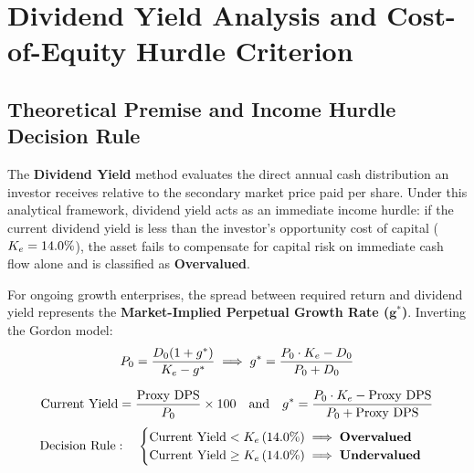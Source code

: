 
\clearpage
\section[Dividend Yield Analysis]{Dividend Yield Analysis and Cost-of-Equity Hurdle Criterion}

\subsection{Theoretical Premise and Income Hurdle Decision Rule}
The \textbf{Dividend Yield} method evaluates the direct annual cash distribution an investor receives relative to the secondary market price paid per share. Under this analytical framework, dividend yield acts as an immediate income hurdle: if the current dividend yield is less than the investor's opportunity cost of capital ($K_e = 14.0\%$), the asset fails to compensate for capital risk on immediate cash flow alone and is classified as \textbf{Overvalued}.

For ongoing growth enterprises, the spread between required return and dividend yield represents the \textbf{Market-Implied Perpetual Growth Rate ($\bm{g^*}$)}. Inverting the Gordon model:
\begin{equation}
    P_0 = \frac{D_0(1 + g^*)}{K_e - g^*} \implies g^* = \frac{P_0 \cdot K_e - D_0}{P_0 + D_0}
\end{equation}

\begin{formulabox}
\begin{equation}
    \text{Current Yield} = \frac{\text{Proxy DPS}}{P_0} \times 100 \quad \text{and} \quad g^* = \frac{P_0 \cdot K_e - \text{Proxy DPS}}{P_0 + \text{Proxy DPS}}
\end{equation}
\vspace{-2mm}
\begin{equation}
    \text{Decision Rule}: \quad
    \begin{cases}
        \text{Current Yield} < K_e \, (14.0\%) \implies \textbf{Overvalued} \\
        \text{Current Yield} \ge K_e \, (14.0\%) \implies \textbf{Undervalued}
    \end{cases}
\end{equation}
\end{formulabox}

